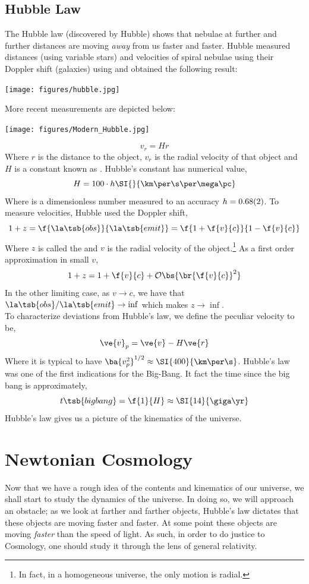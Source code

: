 \documentclass{article}
\begin{document}
\subsection{Hubble Law}

The Hubble law (discovered by Hubble) shows that nebulae at further and further distances are moving \textit{away} from us faster and faster. Hubble measured distances (using variable stars) and velocities of spiral nebulae using their Doppler shift (galaxies) using and obtained the following result:
\begin{center}
    \texttt{[image: figures/hubble.jpg]}
\end{center}
More recent measurements are depicted below:
\begin{center}
    \texttt{[image: figures/Modern\_Hubble.jpg]}
\end{center}
\[ v_{r} = H r \]
Where $r$ is the distance to the object, $v_{r}$ is the radial velocity of that object and $H$ is a constant known as . Hubble's constant has numerical value,
\[ H = 100 \cdot h \SI{}{\km \per \s \per \mega\pc} \]
Where is a dimensionless number measured to an accuracy $h = \SI{0.68\pm0.02}{}$.
To measure velocities, Hubble used the Doppler shift,
\[ 1+ z = \f{\la\tsb{obs}}{\la\tsb{emit}} = \f{1 + \f{v}{c}}{1 - \f{v}{c}} \]
Where $z$ is called the  and $v$ is the radial velocity of the object.\footnote{In fact, in a homogeneous universe, the only motion is radial.} As a first order approximation in small $v$,
\[ 1 + z = 1 + \f{v}{c} + \mathcal{O}\bs{\br{\f{v}{c}}^2} \]
In the other limiting case, as $v \to c$, we have that ${\la\tsb{obs}}/{\la\tsb{emit}} \to \inf$ which makes $z \to \inf$.\\

To characterize deviations from Hubble's law, we define the peculiar velocity to be,
\[ \ve{v}_p = \ve{v} - H \ve{r} \]
Where it is typical to have $\ba{v_p^2}^{1/2} \approx \SI{400}{\km\per\s}$. Hubble's law was one of the first indications for the Big-Bang. It fact the time since the big bang is approximately,
\[ t\tsb{big bang} = \f{1}{H} \approx \SI{14}{\giga\yr} \]
Hubble's law gives us a picture of the kinematics of the universe.

\section{Newtonian Cosmology}

Now that we have a rough idea of the contents and kinematics of our universe, we shall start to study the dynamics of the universe. In doing so, we will approach an obstacle; as we look at farther and farther objects, Hubble's law dictates that these objects are moving faster and faster. At some point these objects are moving \textit{faster} than the speed of light. As such, in order to do justice to Cosmology, one should study it through the lens of general relativity.\\
\end{document}
